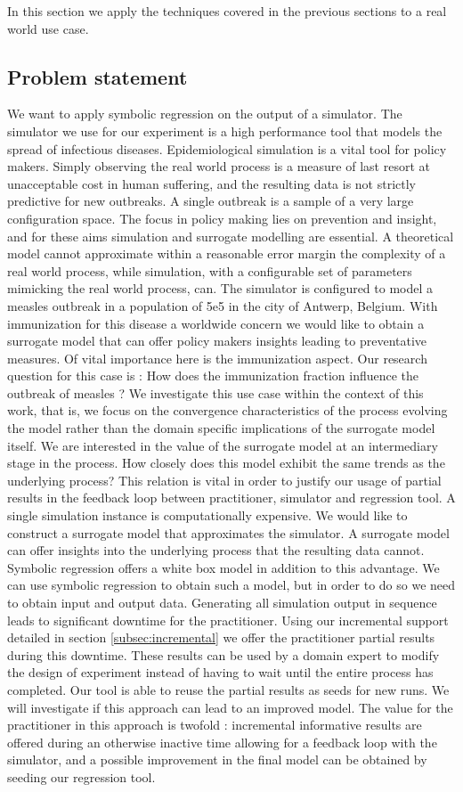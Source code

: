In this section we apply the techniques covered in the previous sections to a real world use case.
\subsection{Problem statement}
We want to apply symbolic regression on the output of a simulator. The simulator we use for our experiment is a high performance tool \citep{stride} that models the spread of infectious diseases. 
Epidemiological simulation is a vital tool for policy makers. Simply observing the real world process is a measure of last resort at unacceptable cost in human suffering, and the resulting data is not strictly predictive for new outbreaks. A single outbreak is a sample of a very large configuration space. The focus in policy making lies on prevention and insight, and for these aims simulation and surrogate modelling are essential. A theoretical model cannot approximate within a reasonable error margin the complexity of a real world process, while simulation, with a configurable set of parameters mimicking the real world process, can.
The simulator is configured to model a measles outbreak in a population of 5e5 in the city of Antwerp, Belgium. With immunization for this disease a worldwide concern we would like to obtain a surrogate model that can offer policy makers insights leading to preventative measures. Of vital importance here is the immunization aspect. Our research question for this case is : How does the immunization fraction influence the outbreak of measles ?
We investigate this use case within the context of this work, that is, we focus on the convergence characteristics of the process evolving the model rather than the domain specific implications of the surrogate model itself. We are interested in the value of the surrogate model at an intermediary stage in the process. How closely does this model exhibit the same trends as the underlying process? This relation is vital in order to justify our usage of partial results in the feedback loop between practitioner, simulator and regression tool.
A single simulation instance is computationally expensive. We would like to construct a surrogate model that approximates the simulator. A surrogate model can offer insights into the underlying process that the resulting data cannot. Symbolic regression offers a white box model in addition to this advantage. We can use symbolic regression to obtain such a model, but in order to do so we need to obtain input and output data. 
Generating all simulation output in sequence leads to significant downtime for the practitioner. Using our incremental support detailed in section \ref{subsec:incremental} we offer the practitioner partial results during this downtime. These results can be used by a domain expert to modify the design of experiment instead of having to wait until the entire process has completed. Our tool is able to reuse the partial results as seeds for new runs. We will investigate if this approach can lead to an improved model.
The value for the practitioner in this approach is twofold : incremental informative results are offered during an otherwise inactive time allowing for a feedback loop with the simulator, and a possible improvement in the final model can be obtained by seeding our regression tool.
